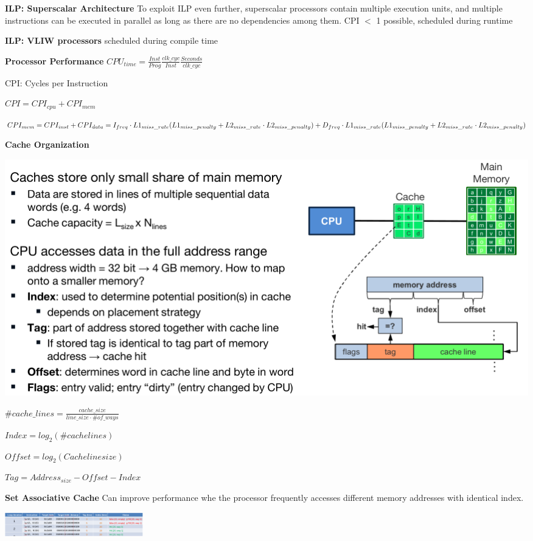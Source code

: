 \documentclass[english]{latex4ei/latex4ei_sheet}
\begin{document}
\textbf{ILP: Superscalar Architecture} To exploit ILP even further, superscalar processors contain multiple execution units, and multiple instructions can be executed in parallel as long as there are no dependencies among them. CPI $<$ 1 possible, scheduled during runtime

\textbf{ILP: VLIW processors} scheduled during compile time

\textbf{Processor Performance} $CPU_{time} = \frac{Inst}{Prog} \frac{clk\_cyc}{Inst} \frac{Seconds}{clk\_cyc}$

CPI: Cycles per Instruction

$CPI = CPI_{cpu} + CPI_{mem}$

$CPI_{mem} = CPI_{inst} + CPI_{data}
	\newline = I_{freq} \cdot L1_{miss\_rate} (L1_{miss\_penalty} + L2_{miss\_rate} \cdot L2_{miss\_penalty}) + D_{freq} \cdot L1_{miss\_rate} (L1_{miss\_penalty} + L2_{miss\_rate} \cdot L2_{miss\_penalty})$

\textbf{Cache Organization}

\begin{center}
	\includegraphics[width = \linewidth]{images/4.ProcessorArchitecture/cache.png}
\end{center}

$\#cache\_lines = \frac{cache\_size}{line\_size \cdot \#of\_ways}$

$Index = log_2(\#cache lines)$

$Offset = log_2(Cache line size)$

$Tag = Address_{size} - Offset - Index$

\textbf{Set Associative Cache}
Can improve performance whe the processor frequently accesses different memory addresses with identical index.
\begin{center}
	\includegraphics[width = 6cm]{images/4.ProcessorArchitecture/SetAcCache.png}
\end{center}
\end{document}
